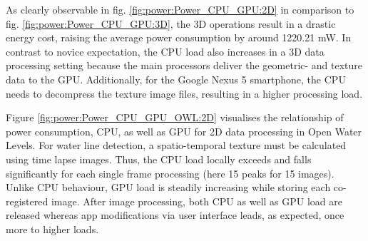 \documentclass[review]{elsarticle}
\begin{document}

As clearly observable in fig. \ref{fig:power:Power_CPU_GPU:2D} in comparison to fig. \ref{fig:power:Power_CPU_GPU:3D}, the 3D operations result in a drastic energy cost, raising the average power consumption by around 1220.21 mW. In contrast to novice expectation, the \gls{CPU} load also increases in a 3D data processing setting because the main processors deliver the geometric- and texture data to the \gls{GPU}. Additionally, for the Google Nexus 5 smartphone, the \gls{CPU} needs to decompress the texture image files, resulting in a higher processing load.

Figure \ref{fig:power:Power_CPU_GPU_OWL:2D} visualises the relationship of power consumption, \gls{CPU}, as well as \gls{GPU} for 2D data processing in Open Water Levels. For water line detection, a spatio-temporal texture must be calculated using time lapse images. Thus, the CPU load locally exceeds and falls significantly for each single frame processing (here 15 peaks for 15 images). Unlike \gls{CPU} behaviour, \gls{GPU} load is steadily increasing while storing each co-registered image. After image processing, both \gls{CPU} as well as \gls{GPU} load are released whereas app modifications via user interface leads, as expected, once more to higher loads.

\end{document}
